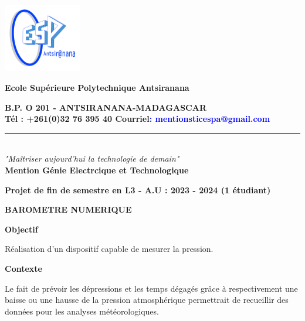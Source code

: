 \documentclass[a4paper,12pt]{report}
\begin{document}
\pagestyle{empty}

\begin{center}
	\begin{minipage}{2.5cm}
	\begin{center}
	\hspace{-3cm}
		\includegraphics[height=3cm]{ESP.png}	
	\end{center}
\end{minipage}\hfill
\begin{minipage}{13cm}
	\begin{center}
    \textbf{Ecole Supérieure Polytechnique Antsiranana}
    \center
    
    \textbf{B.P. O 201 - ANTSIRANANA-MADAGASCAR}\\[2mm]
    \hspace{-1cm}
    \textbf{Tél : +261(0)32 76 395 40 Courriel\textcolor{blue}{: mentionsticespa@gmail.com}}
 	\noindent\rule{\linewidth}{0.5pt}
     
	\end{center}
\end{minipage}\hfill \\[5mm]


\center
\textit{"Maîtriser aujourd'hui la technologie de demain"}\\ [0.5cm]
\center
\textbf{Mention Génie Electrcique et Technologique}\\[5mm]
\center


\center
\textbf{Projet de fin de semestre en L3 - A.U : 2023 - 2024 (1 étudiant)}\\[0.8cm]
\center 

\center
\textbf{BAROMETRE NUMERIQUE}\\[5mm]
\center

\hspace{-15cm}
\textbf{Objectif} \\[1mm]
\begin{flushleft}
Réalisation d’un dispositif capable de mesurer la pression. \\ [3mm]
\end{flushleft}

\hspace{-15cm}
\textbf{Contexte} \\[1mm]
\begin{flushleft}
Le fait de prévoir les dépressions et les temps dégagés grâce à respectivement une baisse ou une hausse de la pression atmosphérique permettrait de recueillir des données  pour les analyses météorologiques. \\ [3mm]
\end{flushleft}


\end{center}
\end{document}
